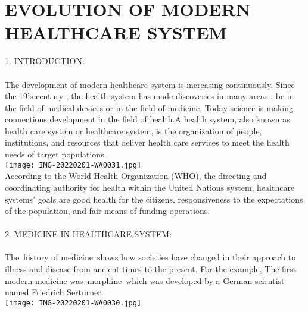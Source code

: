 \documentclass{article}
\begin{document}
\section{EVOLUTION OF MODERN HEALTHCARE SYSTEM}

1. INTRODUCTION:\\
\\
         The development of modern healthcare system is increasing continuously. Since the 19's century , the health system has made discoveries in many areas , be in the field of medical devices or in the field of medicine. Today science is making connections development in the field of health.A health system, also known as health care system or healthcare system, is the organization of people, institutions, and resources that deliver health care services to meet the health needs of target populations.\\ 

  \texttt{[image: IMG-20220201-WA0031.jpg]} \\

   According to the World Health Organization (WHO), the directing and coordinating authority for health within the United Nations system, healthcare systems' goals are good health for the citizens, responsiveness to the expectations of the population, and fair means of funding operations.\\
\\
2. MEDICINE IN HEALTHCARE SYSTEM:\\
\\
 The history of medicine shows how societies have changed in their approach to illness and disease from ancient times to the present. For the example, The first modern medicine was morphine which was developed by a German scientist named Friedrich Serturner.\\

\texttt{[image: IMG-20220201-WA0030.jpg]} \\
\end{document}
